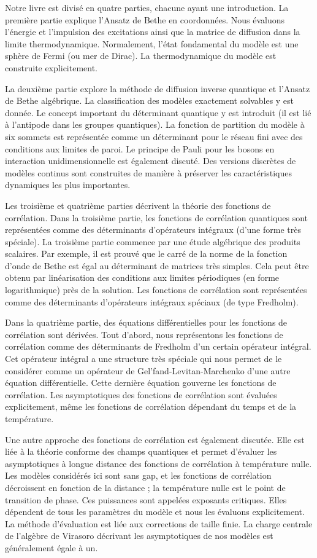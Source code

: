 Notre livre est divisé en quatre parties, chacune ayant une introduction. La première partie explique l'Ansatz de Bethe en coordonnées. Nous évaluons l'énergie et l'impulsion des excitations ainsi que la matrice de diffusion dans la limite thermodynamique. Normalement, l'état fondamental du modèle est une sphère de Fermi (ou mer de Dirac). La thermodynamique du modèle est construite explicitement.

La deuxième partie explore la méthode de diffusion inverse quantique et l'Ansatz de Bethe algébrique. La classification des modèles exactement solvables y est donnée. Le concept important du déterminant quantique y est introduit (il est lié à l'antipode dans les groupes quantiques). La fonction de partition du modèle à six sommets est représentée comme un déterminant pour le réseau fini avec des conditions aux limites de paroi. Le principe de Pauli pour les bosons en interaction unidimensionnelle est également discuté. Des versions discrètes de modèles continus sont construites de manière à préserver les caractéristiques dynamiques les plus importantes.

Les troisième et quatrième parties décrivent la théorie des fonctions de corrélation. Dans la troisième partie, les fonctions de corrélation quantiques sont représentées comme des déterminants d'opérateurs intégraux (d'une forme très spéciale). La troisième partie commence par une étude algébrique des produits scalaires. Par exemple, il est prouvé que le carré de la norme de la fonction d'onde de Bethe est égal au déterminant de matrices très simples. Cela peut être obtenu par linéarisation des conditions aux limites périodiques (en forme logarithmique) près de la solution. Les fonctions de corrélation sont représentées comme des déterminants d'opérateurs intégraux spéciaux (de type Fredholm).

Dans la quatrième partie, des équations différentielles pour les fonctions de corrélation sont dérivées. Tout d'abord, nous représentons les fonctions de corrélation comme des déterminants de Fredholm d'un certain opérateur intégral. Cet opérateur intégral a une structure très spéciale qui nous permet de le considérer comme un opérateur de Gel'fand-Levitan-Marchenko d'une autre équation différentielle. Cette dernière équation gouverne les fonctions de corrélation. Les asymptotiques des fonctions de corrélation sont évaluées explicitement, même les fonctions de corrélation dépendant du temps et de la température.

Une autre approche des fonctions de corrélation est également discutée. Elle est liée à la théorie conforme des champs quantiques et permet d'évaluer les asymptotiques à longue distance des fonctions de corrélation à température nulle. Les modèles considérés ici sont sans gap, et les fonctions de corrélation décroissent en fonction de la distance ; la température nulle est le point de transition de phase. Ces puissances sont appelées exposants critiques. Elles dépendent de tous les paramètres du modèle et nous les évaluons explicitement. La méthode d'évaluation est liée aux corrections de taille finie. La charge centrale de l'algèbre de Virasoro décrivant les asymptotiques de nos modèles est généralement égale à un.

